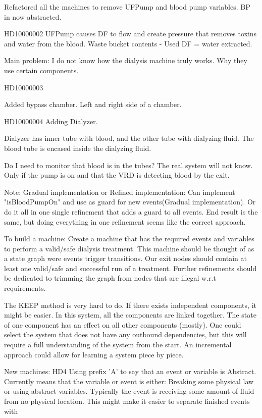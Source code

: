 Refactored all the machines to remove UFPump and blood pump variables. BP in now abstracted. 

HD10000002
UFPump causes DF to flow and create pressure that removes toxins and water from the blood. Waste bucket contents - Used DF = water extracted.

Main problem: I do not know how the dialysis machine truly works. Why they use certain components.


HD10000003

Added bypass chamber. Left and right side of a chamber.


HD10000004
Adding Dialyzer.

Dialyzer has inner tube with blood, and the other tube with dialyzing fluid. The blood tube is encased inside the dialyzing fluid. 

Do I need to monitor that blood is in the tubes? The real system will not know. Only if the pump is on and that the VRD is detecting blood by the exit.

Note: Gradual implementation or Refined implementation: Can implement "isBloodPumpOn" and use as guard for new events(Gradual implementation). Or do it all in one single refinement that adds a guard to all events. End result is the same, but doing everything in one refinement seems like the correct approach. 

To build a machine:
Create a machine that has the required events and variables to perform a valid/safe dialysis treatment. This machine should be thought of as a state graph were events trigger transitions. Our exit nodes should contain at least one valid/safe and successful run of a treatment. Further refinements should be dedicated to trimming the graph from nodes that are illegal w.r.t requirements.

The KEEP method is very hard to do. If there exists independent components, it might be easier. In this system, all the components are linked together.  The state of one component has an effect on all other components (mostly). One could select the system that does not have any outbound dependencies, but this will require a full understanding of the system from the start. An incremental approach could allow for learning a system piece by piece. 



New machines: HD4
Using prefix 'A' to say that an event or variable is Abstract.
Currently means that the variable or event is either: Breaking some physical law or using abstract variables. Typically the event is receiving some amount of fluid from no physical location.  This might make it easier to separate finished events with  


